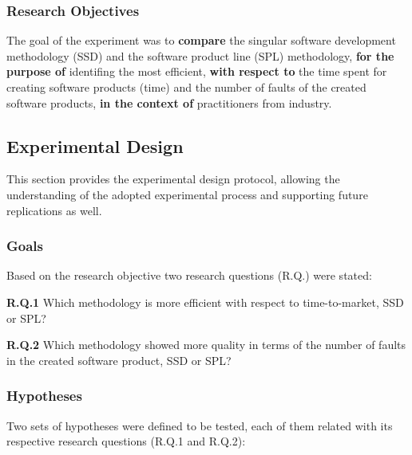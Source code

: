 \subsubsection{Research Objectives}\label{sub:object}

The goal of the experiment was to \textbf{compare} the singular software development methodology (SSD) and the software product line (SPL) methodology, \textbf{for the purpose of} identifing the most efficient, \textbf{with respect to} the time spent for creating software products (time) and the number of faults of the created software products, \textbf{in the context of} practitioners from industry.





\subsection{Experimental Design}\label{sub:design}

This section provides the experimental design protocol, allowing the understanding of the adopted experimental process and supporting future replications as well.


\subsubsection{Goals}

Based on the research objective two research questions (R.Q.) were stated:


\textbf{R.Q.1} Which methodology is more efficient with respect to time-to-market, SSD or SPL?

\textbf{R.Q.2} Which methodology showed more quality in terms of the number of faults in the created software product, SSD or SPL?

\subsubsection{Hypotheses}

Two sets of hypotheses were defined to be tested, each of them related with its respective research questions (R.Q.1 and R.Q.2):


